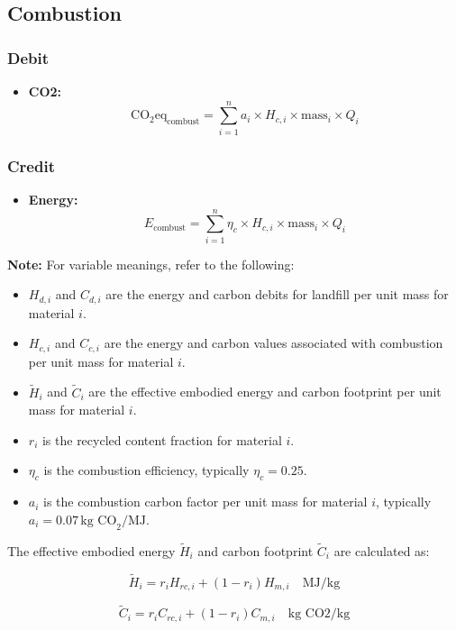 \documentclass[a4paper, twocolumn]{article}
\begin{document}
\subsection*{Combustion}

\subsubsection*{Debit}
\begin{itemize}
    \item \textbf{CO2:} 
    \[
    \text{CO}_2\text{eq}_{\text{combust}} = \sum_{i=1}^{n} a_i \times H_{c,i} \times \text{mass}_i \times Q_i
    \]
\end{itemize}

\subsubsection*{Credit}
\begin{itemize}
    \item \textbf{Energy:} 
    \[
    E_{\text{combust}} = \sum_{i=1}^{n} \eta_c \times H_{c,i} \times \text{mass}_i \times Q_i
    \]
\end{itemize}

\textbf{Note:} For variable meanings, refer to the following:
\begin{itemize}
    \item \( H_{d,i} \) and \( C_{d,i} \) are the energy and carbon debits for landfill per unit mass for material \(i\).
    \item \( H_{c,i} \) and \( C_{c,i} \) are the energy and carbon values associated with combustion per unit mass for material \(i\).
    \item \( \tilde{H}_i \) and \( \tilde{C}_i \) are the effective embodied energy and carbon footprint per unit mass for material \(i\).
    \item \( r_i \) is the recycled content fraction for material \(i\).
    \item \( \eta_c \) is the combustion efficiency, typically \( \eta_c = 0.25 \).
    \item \( a_i \) is the combustion carbon factor per unit mass for material \(i\), typically \( a_i = 0.07 \, \text{kg CO}_2/\text{MJ} \).
\end{itemize}

The effective embodied energy \( \tilde{H}_i \) and carbon footprint \( \tilde{C}_i \) are calculated as:

\[
\tilde{H}_i = r_i H_{rc,i} + (1 - r_i) H_{m,i} \quad \text{MJ/kg}
\]

\[
\tilde{C}_i = r_i C_{rc,i} + (1 - r_i) C_{m,i} \quad \text{kg CO2/kg}
\]
\end{document}
